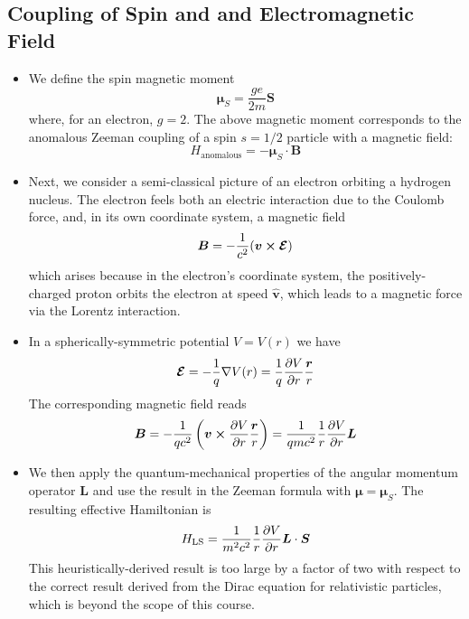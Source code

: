 \documentclass[11pt, a4paper]{article}
\renewcommand{\grad}{\nabla}
\renewcommand{\vec}[1]{\bm{#1}}  %
\newcommand{\uvec}[1]{\hat{\vec{#1}}}  %
\renewcommand{\r}{\vec{r}}  %
\renewcommand{\L}{\vec{L}}  %
\renewcommand{\S}{\vec{S}}  %
\newcommand{\B}{\vec{B}}  %
\newcommand{\m}{\vec{\mu}}  %
\begin{document}
\subsection{Coupling of Spin and and Electromagnetic Field}
\begin{itemize}
	\item We define the spin magnetic moment
	\begin{equation*}
		\m_{S} = \frac{ge}{2m} \S
	\end{equation*}
	where, for an electron, $ g = 2 $. The above magnetic moment corresponds to the anomalous Zeeman coupling of a spin $ s = 1/2 $ particle with a magnetic field:
	\begin{equation*}
		H_{\text{anomalous}} = - \m_{S} \cdot \B
	\end{equation*}
	
	\item Next, we consider a semi-classical picture of an electron orbiting a hydrogen nucleus. The electron feels both an electric interaction due to the Coulomb force, and, in its own coordinate system, a magnetic field 
	\begin{equation*}
		\B = -\frac{1}{c^{2}}(\vec{v} \cross \vec{\mathcal{E}})
	\end{equation*}
	which arises because in the electron's coordinate system, the positively-charged proton orbits the electron at speed $ \uvec{v} $, which leads to a magnetic force via the Lorentz interaction.
	
	\item In a spherically-symmetric potential $ V = V(r) $ we have
	\begin{equation*}
		\vec{\mathcal{E}} = - \frac{1}{q}\grad V(r) = \frac{1}{q}\pdv{V}{r} \frac{\r}{r}
	\end{equation*}
	The corresponding magnetic field reads
	\begin{equation*}
		\B = -\frac{1}{qc^{2}}\left(\vec{v} \cross \pdv{V}{r}\frac{\r}{r}\right) = \frac{1}{qmc^{2}}\frac{1}{r}\pdv{V}{r}\L
	\end{equation*}
	
	\item We then apply the quantum-mechanical properties of the angular momentum operator $ \L $ and use the result in the Zeeman formula with $ \m = \m_{S} $. The resulting effective Hamiltonian is
	\begin{equation*}
		H_{\text{LS}} = \frac{1}{m^{2}c^{2}}\frac{1}{r}\pdv{V}{r} \L \cdot \S
	\end{equation*}
	This heuristically-derived result is too large by a factor of two with respect to the correct result derived from the Dirac equation for relativistic particles, which is beyond the scope of this course. 
	

\end{itemize}
\end{document}
